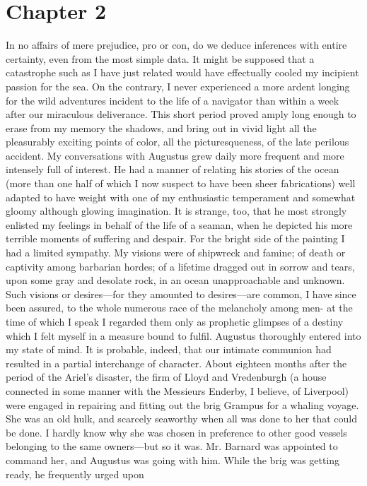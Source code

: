\section{Chapter 2}
In no affairs of mere prejudice, pro or con, do we deduce inferences with
entire certainty, even from the most simple data. It might be supposed that a
catastrophe such as I have just related would have effectually cooled my
incipient passion for the sea. On the contrary, I never experienced a more
ardent longing for the wild adventures incident to the life of a navigator than
within a week after our miraculous deliverance. This short period proved amply
long enough to erase from my memory the shadows, and bring out in vivid light
all the pleasurably exciting points of color, all the picturesqueness, of the
late perilous accident. My conversations with Augustus grew daily more frequent
and more intensely full of interest. He had a manner of relating his stories of
the ocean (more than one half of which I now suspect to have been sheer
fabrications) well adapted to have weight with one of my enthusiastic
temperament and somewhat gloomy although glowing imagination. It is strange,
too, that he most strongly enlisted my feelings in behalf of the life of a
seaman, when he depicted his more terrible moments of suffering and despair. For
the bright side of the painting I had a limited sympathy. My visions were of
shipwreck and famine; of death or captivity among barbarian hordes; of a
lifetime dragged out in sorrow and tears, upon some gray and desolate rock, in
an ocean unapproachable and unknown. Such visions or desires---for they amounted
to desires---are common, I have since been assured, to the whole numerous race
of the melancholy among men- at the time of which I speak I regarded them only
as prophetic glimpses of a destiny which I felt myself in a measure bound to
fulfil. Augustus thoroughly entered into my state of mind. It is probable,
indeed, that our intimate communion had resulted in a partial interchange of
character. About eighteen months after the period of the Ariel's disaster, the
firm of Lloyd and Vredenburgh (a house connected in some manner with the
Messieurs Enderby, I believe, of Liverpool) were engaged in repairing and
fitting out the brig Grampus for a whaling voyage. She was an old hulk, and
scarcely seaworthy when all was done to her that could be done. I hardly know
why she was chosen in preference to other good vessels belonging to the same
owners---but so it was. Mr. Barnard was appointed to command her, and Augustus
was going with him. While the brig was getting ready, he frequently urged upon
